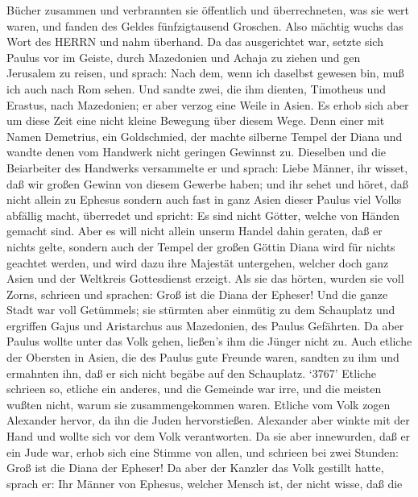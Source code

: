 Bücher zusammen und verbrannten sie öffentlich und überrechneten, was
sie wert waren, und fanden des Geldes fünfzigtausend Groschen.
 Also mächtig wuchs das Wort des HERRN und nahm überhand.
 Da das ausgerichtet war, setzte sich Paulus vor im Geiste,
durch Mazedonien und Achaja zu ziehen und gen Jerusalem zu reisen, und
sprach: Nach dem, wenn ich daselbst gewesen bin, muß ich auch nach Rom
sehen.  Und sandte zwei, die ihm dienten, Timotheus und
Erastus, nach Mazedonien; er aber verzog eine Weile in Asien.
 Es erhob sich aber um diese Zeit eine nicht kleine
Bewegung über diesem Wege.  Denn einer mit Namen Demetrius,
ein Goldschmied, der machte silberne Tempel der Diana und wandte denen
vom Handwerk nicht geringen Gewinnst zu.  Dieselben und die
Beiarbeiter des Handwerks versammelte er und sprach: Liebe Männer, ihr
wisset, daß wir großen Gewinn von diesem Gewerbe haben; 
und ihr sehet und höret, daß nicht allein zu Ephesus sondern auch fast
in ganz Asien dieser Paulus viel Volks abfällig macht, überredet und
spricht: Es sind nicht Götter, welche von Händen gemacht sind.
 Aber es will nicht allein unserm Handel dahin geraten, daß
er nichts gelte, sondern auch der Tempel der großen Göttin Diana wird
für nichts geachtet werden, und wird dazu ihre Majestät untergehen,
welcher doch ganz Asien und der Weltkreis Gottesdienst erzeigt.
 Als sie das hörten, wurden sie voll Zorns, schrieen und
sprachen: Groß ist die Diana der Epheser!  Und die ganze
Stadt war voll Getümmels; sie stürmten aber einmütig zu dem Schauplatz
und ergriffen Gajus und Aristarchus aus Mazedonien, des Paulus
Gefährten.  Da aber Paulus wollte unter das Volk gehen,
ließen's ihm die Jünger nicht zu.  Auch etliche der
Obersten in Asien, die des Paulus gute Freunde waren, sandten zu ihm und
ermahnten ihn, daß er sich nicht begäbe auf den Schauplatz.
 `3767' Etliche schrieen so, etliche ein anderes, und die
Gemeinde war irre, und die meisten wußten nicht, warum sie
zusammengekommen waren.  Etliche vom Volk zogen Alexander
hervor, da ihn die Juden hervorstießen. Alexander aber winkte mit der
Hand und wollte sich vor dem Volk verantworten.  Da sie
aber innewurden, daß er ein Jude war, erhob sich eine Stimme von allen,
und schrieen bei zwei Stunden: Groß ist die Diana der Epheser!
 Da aber der Kanzler das Volk gestillt hatte, sprach er:
Ihr Männer von Ephesus, welcher Mensch ist, der nicht wisse, daß die

